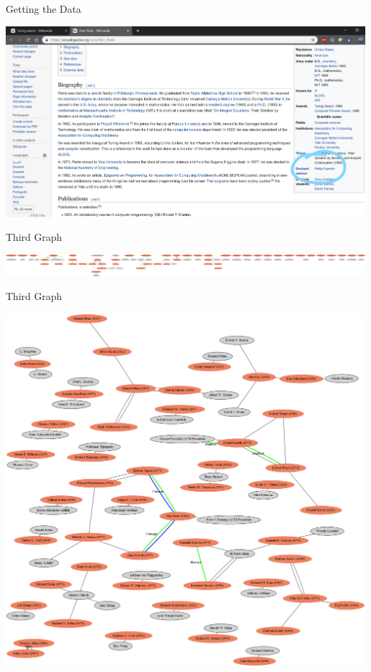 \documentclass[11pt,aspectratio=169]{beamer}
\begin{document}
\begin{frame}{Getting the Data}
    \begin{center}
        \includegraphics[scale=0.13]{wiki2.jpg}
    \end{center}
\end{frame}

\begin{frame}{Third Graph}
    \begin{center}
        \includegraphics[scale = 0.045]{dotrel4.png}
    \end{center}
\end{frame}

\begin{frame}{Third Graph}
    \vspace{-0.5cm}
    \begin{center}
        \includegraphics[scale = 0.11]{neatorel4.png}
    \end{center}
\end{frame}
\end{document}

